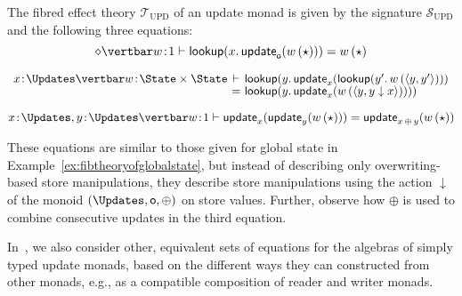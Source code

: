 \begin{example}
\label{ex:fibtheoryofupdatemonads}
The fibred effect theory $\mathcal{T}_{\text{UPD}}$ of an update monad is given by the signature $\mathcal{S}_{\text{UPD}}$ and the following three equations:
\[
{\diamond \vertbar w \!:\! 1} \vdash \mathsf{lookup}(x .\, \mathsf{update}_{\mathsf{o}}(w\, (\star))) = w\, (\star)
\vspace{0.15cm}
\]

\[
\begin{array}{c@{~} c@{~} l}
{x \!:\! \Updates \vertbar w \!:\! \State \times \State} & \vdash & \mathsf{lookup}(y .\, \mathsf{update}_x(\mathsf{lookup}(y' .\, w\, (\langle y , y' \rangle))) 
\\[-0.5mm]
& = & \mathsf{lookup}(y .\, \mathsf{update}_x(w\, (\langle y , y \downarrow x \rangle))))
\end{array}
\vspace{0.15cm}
\]

\[
{x \!:\! \Updates, y \!:\! \Updates \vertbar w \!:\! 1} \vdash \mathsf{update}_x(\mathsf{update}_y(w\, (\star))) = \mathsf{update}_{x \, \oplus \, y}(w\, (\star))
\]

These equations are similar to those given for global state in Example~\ref{ex:fibtheoryofglobalstate}, but instead of describing only overwriting-based store manipulations, they describe store manipulations using the action $\downarrow$ of the monoid $(\Updates, \mathsf{o}, \oplus)$ on store values. Further, observe how $\oplus$ is used to combine consecutive updates in the third equation.
\end{example}

In~\cite{Ahman:UpdateMonads}, we also consider other,  equivalent sets of equations for the algebras of simply typed update monads, based on the different ways they can constructed from other monads, e.g., as a compatible composition of reader and writer monads.

